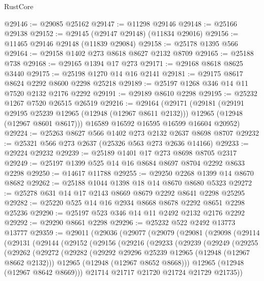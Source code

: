 \begin{lexlean}{RustCore}
\begin{coremodule}
@29146 := @29085 @25162
@29147 := @11298 @29146
@29148 := @25166 @29138
@29152 := @29145 (@29147 @29148) (@11834 @29016)
@29156 := @11465 @29146 @29148 (@11839 @29084)
@29158 := @25178 @1395 @566
@29164 := @29158 @1402 @273 @8618 @8627 @2132 @8709
@29165 := @25188 @738
@29168 := @29165 @1394 @17 @273
@29171 := @29168 @8618 @8625 @3440
@29175 := @25198 @1270 @14 @16 @2141
@29181 := @29175 @8617 @8624 @2292 @8600 @2298 @25218
@29189 := @25197 @1268 @346 @14 @11 @7520 @2132 @2176 @2292
@29191 := @29189 @8610 @2298
@29195 := @25232 @1267 @7520 @26515 @26519
@29216 := @29164
    (@29171
      (@29181
        (@29191 @29195 @25239 @12965 (@12948 (@12967 @8611 @2132)))
        @12965
        (@12948 (@12967 @8601 @8617)))
      @16589
      @16592
      @16595
      @16599
      @16604
      @20952)
@29224 := @25263 @8627 @566 @1402 @273 @2132 @2637 @8698 @8707
@29232 := @25321 @566 @273 @2637 (@25326 @563 @273 @2636 @14166)
@29233 := @29224 @29232
@29239 := @25189 @1401 @17 @273 @8698 @8705 @2317
@29249 := @25197 @1399 @525 @14 @16 @8684 @8697 @8704 @2292 @8633 @2298
@29250 := @14617 @11788
@29255 := @29250 @2268 @1399 @14 @8670 @8682
@29262 := @25188 @1044 @1398 @18 @14 @8670 @8680 @5323
@29272 := @25278 @631 @14 @17 @2143 @8669 @8679 @2292 @8641 @2298 @25295
@29282 := @25220 @525 @14 @16 @2934 @8668 @8678 @2292 @8651 @2298 @25236
@29290 := @25197 @523 @346 @14 @11 @2492 @2132 @2176 @2292
@29292 := @29290 @8661 @2298
@29296 := @25232 @522 @2492 @13773 @13777
@29359 := @29011
    (@29036
      (@29077
        (@29079
          (@29081
            (@29098
              (@29114
                (@29131
                  (@29144
                    (@29152
                      (@29156
                        (@29216
                          (@29233
                            (@29239
                              (@29249
                                (@29255
                                  (@29262
                                    (@29272
                                      (@29282
                                        (@29292 @29296 @25239 @12965 (@12948 (@12967 @8662 @2132)))
                                        @12965
                                        (@12948 (@12967 @8652 @8668)))
                                      @12965
                                      (@12948 (@12967 @8642 @8669)))
                                    @21714
                                    @21717
                                    @21720
                                    @21724
                                    @21729
                                    @21735))

\end{coremodule}
\end{lexlean}
